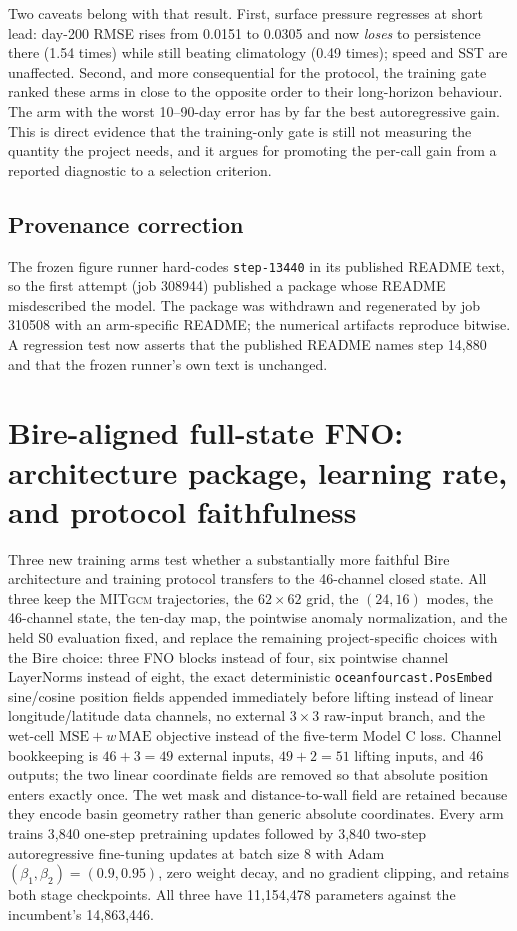 \documentclass[11pt]{article}
\newcommand{\MITgcm}{\textsc{MITgcm}}
\begin{document}
Two caveats belong with that result.  First, surface pressure regresses at short lead:
day-200 RMSE rises from 0.0151 to 0.0305 and now \emph{loses} to persistence there
(1.54 times) while still beating climatology (0.49 times); speed and SST are unaffected.
Second, and more consequential for the protocol, the training gate ranked these arms in
close to the opposite order to their long-horizon behaviour.  The arm with the worst
10--90-day error has by far the best autoregressive gain.  This is direct evidence that
the training-only gate is still not measuring the quantity the project needs, and it
argues for promoting the per-call gain from a reported diagnostic to a selection
criterion.

\subsection{Provenance correction}

The frozen figure runner hard-codes \texttt{step-13440} in its published README text, so
the first attempt (job 308944) published a package whose README misdescribed the model.
The package was withdrawn and regenerated by job 310508 with an arm-specific README; the
numerical artifacts reproduce bitwise.  A regression test now asserts that the published
README names step 14,880 and that the frozen runner's own text is unchanged.

\section{Bire-aligned full-state FNO: architecture package, learning rate, and
protocol faithfulness}

Three new training arms test whether a substantially more faithful Bire architecture
and training protocol transfers to the 46-channel closed state.  All three keep the
\MITgcm{} trajectories, the \(62\times62\) grid, the \((24,16)\) modes, the 46-channel
state, the ten-day map, the pointwise anomaly normalization, and the held S0 evaluation
fixed, and replace the remaining project-specific choices with the Bire choice: three
FNO blocks instead of four, six pointwise channel LayerNorms instead of eight, the exact
deterministic \texttt{oceanfourcast.PosEmbed} sine/cosine position fields appended
immediately before lifting instead of linear longitude/latitude data channels, no
external \(3\times3\) raw-input branch, and the wet-cell \(\mathrm{MSE}+w\,\mathrm{MAE}\)
objective instead of the five-term Model C loss.  Channel bookkeeping is
\(46+3=49\) external inputs, \(49+2=51\) lifting inputs, and 46 outputs; the two linear
coordinate fields are removed so that absolute position enters exactly once.  The wet
mask and distance-to-wall field are retained because they encode basin geometry rather
than generic absolute coordinates.  Every arm trains 3,840 one-step pretraining updates
followed by 3,840 two-step autoregressive fine-tuning updates at batch size 8 with
Adam\((\beta_1,\beta_2)=(0.9,0.95)\), zero weight decay, and no gradient clipping, and
retains both stage checkpoints.  All three have 11,154,478 parameters against the
incumbent's 14,863,446.
\end{document}
